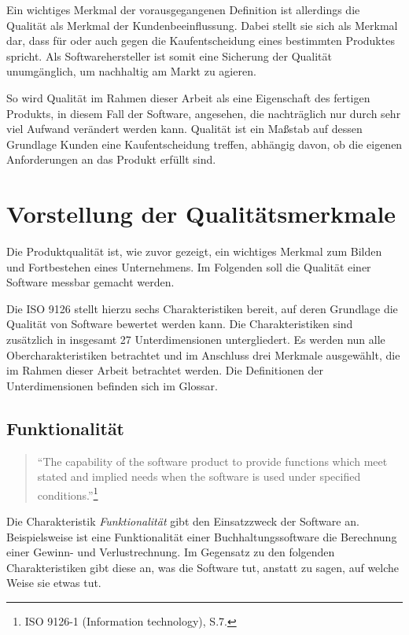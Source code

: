         Ein wichtiges Merkmal der vorausgegangenen Definition ist allerdings die Qualität als Merkmal der Kundenbeeinflussung. Dabei stellt sie sich als Merkmal dar, dass für oder auch gegen die Kaufentscheidung eines bestimmten Produktes spricht. Als Softwarehersteller ist somit eine Sicherung der Qualität unumgänglich, um nachhaltig am Markt zu agieren.

        So wird Qualität im Rahmen dieser Arbeit als eine Eigenschaft des fertigen Produkts, in diesem Fall der Software, angesehen, die nachträglich nur durch sehr viel Aufwand verändert werden kann. Qualität ist ein Maßstab auf dessen Grundlage Kunden eine Kaufentscheidung treffen, abhängig davon, ob die eigenen Anforderungen an das Produkt erfüllt sind.

%
%
    \section{Vorstellung der Qualitätsmerkmale}
    \label{sec:vorstellungMerkmale}

        Die Produktqualität ist, wie zuvor gezeigt, ein wichtiges Merkmal zum Bilden und Fortbestehen eines Unternehmens. Im Folgenden soll die Qualität einer Software messbar gemacht werden.

        Die ISO 9126 stellt hierzu sechs Charakteristiken bereit, auf deren Grundlage die Qualität von Software bewertet werden kann. Die Charakteristiken sind zusätzlich in insgesamt 27 Unterdimensionen untergliedert. Es werden nun alle Obercharakteristiken betrachtet und im Anschluss drei Merkmale ausgewählt, die im Rahmen dieser Arbeit betrachtet werden. Die Definitionen der Unterdimensionen befinden sich im Glossar.

        \subsection{Funktionalität}

            \begin{quote}
              \enquote{The capability of the software product to provide functions which meet stated and implied needs when the software is used under specified conditions.}\footnote{ISO 9126-1 (Information technology), S.7.}
            \end{quote}

            Die Charakteristik \emph{Funktionalität} gibt den Einsatzzweck der Software an. Beispielsweise ist eine Funktionalität einer Buchhaltungssoftware die Berechnung einer Gewinn- und Verlustrechnung. Im Gegensatz zu den folgenden Charakteristiken gibt diese an, was die Software tut, anstatt zu sagen, auf welche Weise sie etwas tut.

